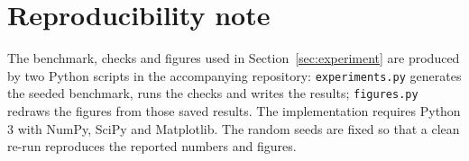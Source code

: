 \section*{Reproducibility note}
The benchmark, checks and figures used in Section~\ref{sec:experiment} are
produced by two Python scripts in the accompanying repository:
\texttt{experiments.py} generates the seeded benchmark, runs the checks and
writes the results; \texttt{figures.py} redraws the figures from those saved
results. The implementation requires Python 3 with NumPy, SciPy and
Matplotlib. The random seeds are fixed so that a clean re-run reproduces the
reported numbers and figures.

